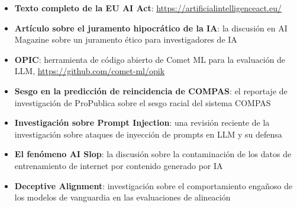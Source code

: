 \begin{itemize}
    \item \textbf{Texto completo de la EU AI Act}: \url{https://artificialintelligenceact.eu/}
    \item \textbf{Artículo sobre el juramento hipocrático de la IA}: la discusión en AI Magazine sobre un juramento ético para investigadores de IA
    \item \textbf{OPIC}: herramienta de código abierto de Comet ML para la evaluación de LLM, \url{https://github.com/comet-ml/opik}
    \item \textbf{Sesgo en la predicción de reincidencia de COMPAS}: el reportaje de investigación de ProPublica sobre el sesgo racial del sistema COMPAS
    \item \textbf{Investigación sobre Prompt Injection}: una revisión reciente de la investigación sobre ataques de inyección de prompts en LLM y su defensa
    \item \textbf{El fenómeno AI Slop}: la discusión sobre la contaminación de los datos de entrenamiento de internet por contenido generado por IA
    \item \textbf{Deceptive Alignment}: investigación sobre el comportamiento engañoso de los modelos de vanguardia en las evaluaciones de alineación
\end{itemize}



